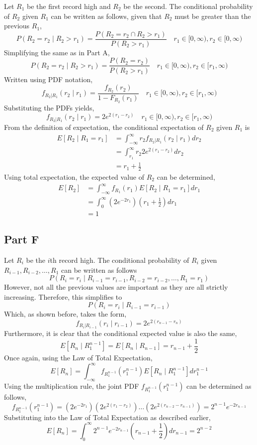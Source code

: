 \documentclass{article}
\begin{document}
Let $R_1$ be the first record high and $R_2$ be the second. The conditional
probability of $R_2$ given $R_1$ can be written as follows, given that $R_2$
must be greater than the previous $R_1$,
$$ P(R_2 = r_2 \mid R_2 > r_1) = \frac{P(R_2 = r_2 \cap R_2 > r_1)}{P(R_2 >
r_1)} \quad r_1 \in [0, \infty), r_2 \in [0, \infty) $$
Simplifying the same as in Part A,
$$ P(R_2 = r_2 \mid R_2 > r_1) = \frac{P(R_2 = r_2)}{P(R_2 > r_1)} \quad r_1
\in [0, \infty), r_2 \in [r_1, \infty) $$
Written using PDF notation,
$$ f_{R_2|R_1}(r_2 \mid r_1) = \frac{f_{R_2}(r_2)}{1 - F_{R_2}(r_1)} \quad
r_1 \in [0, \infty), r_2 \in [r_1, \infty) $$
Substituting the PDFs yields,
$$ f_{R_2|R_1}(r_2 \mid r_1) = 2 e^{2(r_1 - r_2)} \quad r_1 \in [0, \infty),
r_2 \in [r_1, \infty) $$
From the definition of expectation, the conditional expectation of $R_2$
given $R_1$ is
\begin{align*}
  E[R_2 \mid R_1 = r_1] &= \int_{-\infty}^{\infty} r_2 f_{R_2|R_1}(r_2 \mid
  r_1) dr_{2} \\
  &= \int_{r_1}^{\infty} r_2 2 e^{2(r_1 - r_2)} dr_2 \\
  &= r_1 + \frac{1}{2} 
\end{align*}
Using total expectation, the expected value of $R_2$ can be determined,
\begin{align*}
  E[R_2] &= \int_{-\infty}^{\infty} f_{R_1}(r_1) E[R_2 \mid R_1 = r_1] dr_1 \\
  &= \int_0^{\infty} \left(2e^{-2r_1}\right) \left(r_1 + \frac{1}{2}\right)
  dr_1 \\
  &= 1
\end{align*}

\subsection*{Part F}

Let $R_i$ be the $i$th record high. The conditional probability of $R_i$
given $R_{i - 1}, R_{i - 2}, \ldots, R_{1}$ can be written as follows
$$ P(R_i = r_i \mid R_{i - 1} = r_{i - 1}, R_{i - 2} = r_{i - 2}, \ldots, R_1
= r_1) $$
However, not all the previous values are important as they are all strictly
increasing. Therefore, this simplifies to
$$ P(R_i = r_i \mid R_{i - 1} = r_{i - 1}) $$
Which, as shown before, takes the form,
$$ f_{R_i|R_{i - 1}}(r_i \mid r_{i-1}) = 2 e^{2(r_{n - 1} - r_n)} $$
Furthermore, it is clear that the conditional expected value is also the same,
$$ E[R_n \mid R_1^{n - 1}] = E[R_n \mid R_{n - 1}] = r_{n - 1} + \frac{1}{2} $$
Once again, using the Law of Total Expectation,
$$ E[R_n] = \int_{-\infty}^\infty f_{R_1^{n-1}}\left(r_1^{n-1}\right)
E\left[R_n \mid R_1^{n - 1}\right] dr_1^{n - 1} $$
Using the multiplication rule, the joint PDF $f_{R_1^{n - 1}}\left(r_1^{n -
1}\right)$ can be determined as follows,
$$ f_{R_1^{n - 1}}\left(r_1^{n - 1}\right) = \left(2 e^{-2r_1}\right) \left(2
e^{2(r_1 - r_2)}\right) \ldots \left(2 e^{2(r_{n - 2} - r_{n - 1})}\right) =
2^{n - 1} e^{-2r_{n - 1}} $$
Substituting into the Law of Total Expectation as described earlier,
$$ E[R_n] = \int_0^\infty 2^{n - 1} e^{-2r_{n - 1}} \left(r_{n - 1} +
\frac{1}{2}\right) dr_{n - 1} = 2^{n - 2}$$
\end{document}
